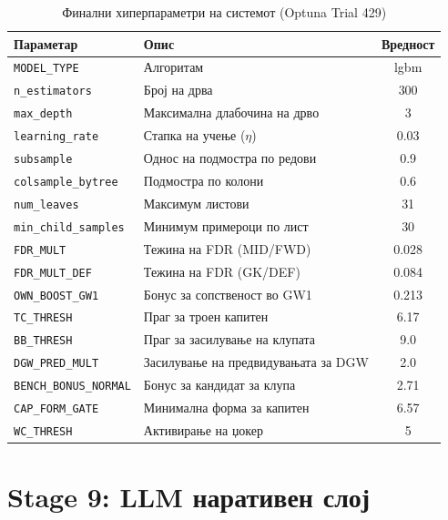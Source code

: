 \begin{table}[h]
\centering
\caption{Финални хиперпараметри на системот (Optuna Trial 429)}
\label{tab:hyperparams_en}
\begin{tabular}{llc}
\toprule
\textbf{Параметар} & \textbf{Опис} & \textbf{Вредност} \\
\midrule
\texttt{MODEL\_TYPE}          & Алгоритам                  & lgbm   \\
\texttt{n\_estimators}        & Број на дрва               & 300    \\
\texttt{max\_depth}           & Максимална длабочина на дрво & 3    \\
\texttt{learning\_rate}       & Стапка на учење ($\eta$)   & 0.03   \\
\texttt{subsample}            & Однос на подмостра по редови & 0.9  \\
\texttt{colsample\_bytree}    & Подмостра по колони        & 0.6    \\
\texttt{num\_leaves}          & Максимум листови           & 31     \\
\texttt{min\_child\_samples}  & Минимум примероци по лист  & 30     \\
\midrule
\texttt{FDR\_MULT}            & Тежина на FDR (MID/FWD)    & 0.028  \\
\texttt{FDR\_MULT\_DEF}       & Тежина на FDR (GK/DEF)     & 0.084  \\
\texttt{OWN\_BOOST\_GW1}      & Бонус за сопственост во GW1 & 0.213 \\
\texttt{TC\_THRESH}           & Праг за троен капитен      & 6.17   \\
\texttt{BB\_THRESH}           & Праг за засилување на клупата & 9.0 \\
\texttt{DGW\_PRED\_MULT}      & Засилување на предвидувањата за DGW & 2.0 \\
\texttt{BENCH\_BONUS\_NORMAL} & Бонус за кандидат за клупа & 2.71   \\
\texttt{CAP\_FORM\_GATE}      & Минимална форма за капитен & 6.57   \\
\texttt{WC\_THRESH}           & Активирање на џокер        & 5      \\
\bottomrule
\end{tabular}
\end{table}

\section{Stage 9: LLM наративен слој}

